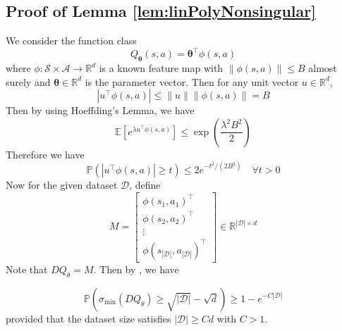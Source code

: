 \subsection{Proof of Lemma \ref{lem:linPolyNonsingular}}
We consider the function class
$$
Q_{\boldsymbol{\theta}}(s, a)=\boldsymbol{\theta}^{\top} \phi(s, a)
$$
where $\phi: \mathcal{S} \times \mathcal{A} \rightarrow \mathbb{R}^d$ is a known feature map with $\|\phi(s, a)\| \leq B$ almost surely and $\boldsymbol{\theta} \in \mathbb{R}^d$ is the parameter vector. Then for any unit vector $u \in \mathbb{R}^d$, 
$$
\left|u^{\top} \phi(s, a)\right| \leq\|u\|\|\phi(s, a)\|=B
$$
Then by using Hoeffding's Lemma, we have
$$
\mathbb{E}\left[e^{\lambda u^{\top} \phi(s, a)}\right] \leq \exp \left(\frac{\lambda^2 B^2}{2}\right)
$$
Therefore we have
$$
\mathbb{P}\left(\left|u^{\top} \phi(s, a)\right| \geq t\right) \leq 2 e^{-t^2 /\left(2 B^2\right)} \quad \forall t>0
$$
Now for the given dataset $\mathcal{D}$, define
$$M=\left[\begin{array}{c}\phi\left(s_1, a_1\right)^{\top} \\ \phi\left(s_2, a_2\right)^{\top} \\ \vdots \\ \phi\left(s_{|\mathcal{D}|}, a_{|\mathcal{D}|}\right)^{\top}\end{array}\right] \in \mathbb{R}^{|\mathcal{D}| \times d}$$
Note that $D Q_\theta=M$. Then by \citet{rudelson2009smallest}, we have

$$\mathbb{P}\left(\sigma_{\min }(D Q_\theta) \geq \sqrt{|\mathcal{D}|}-\sqrt{d}\right) \geq 1-e^{-C|\mathcal{D}|}$$
provided that the dataset size satisfies $|\mathcal{D}| \geq C d$ with $C>1$.


